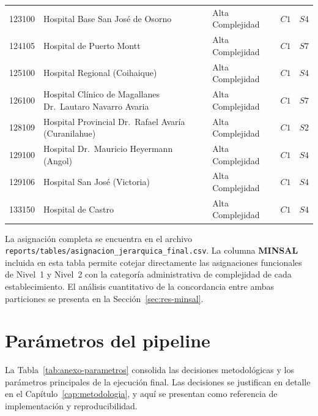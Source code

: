 \begin{longtable}{p{1.3cm} p{6.8cm} p{2.4cm} p{1.0cm} p{1.0cm}}
123100 & Hospital Base San José de Osorno & Alta Complejidad & $C1$ & $S4$ \\
124105 & Hospital de Puerto Montt & Alta Complejidad & $C1$ & $S7$ \\
125100 & Hospital Regional (Coihaique) & Alta Complejidad & $C1$ & $S4$ \\
126100 & Hospital Clínico de Magallanes Dr.\ Lautaro Navarro Avaria & Alta Complejidad & $C1$ & $S7$ \\
128109 & Hospital Provincial Dr.\ Rafael Avaría (Curanilahue) & Alta Complejidad & $C1$ & $S2$ \\
129100 & Hospital Dr.\ Mauricio Heyermann (Angol) & Alta Complejidad & $C1$ & $S4$ \\
129106 & Hospital San José (Victoria) & Alta Complejidad & $C1$ & $S4$ \\
133150 & Hospital de Castro & Alta Complejidad & $C1$ & $S4$ \\

\bottomrule
\end{longtable}

La asignación completa se encuentra en el archivo
\texttt{reports/tables/asignacion\_jerarquica\_final.csv}. La columna
\textbf{MINSAL} incluida en esta tabla permite cotejar directamente las
asignaciones funcionales de Nivel~1 y Nivel~2 con la categoría administrativa
de complejidad de cada establecimiento. El análisis cuantitativo de la
concordancia entre ambas particiones se presenta en la
Sección~\ref{sec:res-minsal}.


\section{Parámetros del pipeline}
\label{anexo:parametros}

La Tabla~\ref{tab:anexo-parametros} consolida las decisiones metodológicas y
los parámetros principales de la ejecución final. Las decisiones se justifican
en detalle en el Capítulo~\ref{cap:metodologia}, y aquí se presentan como
referencia de implementación y reproducibilidad.

